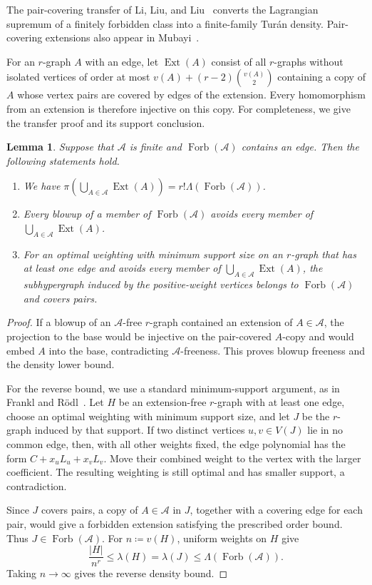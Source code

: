 \documentclass[10pt]{article}
\numberwithin{equation}{section}
\newtheorem{lemma}[lemma]{Lemma}\aliascntresetthe{lemma}
\theoremstyle{definition}
\newcommand{\cA}{\mathcal A}\newcommand{\cB}{\mathcal B}\newcommand{\cC}{\mathcal C}
\newcommand{\Forb}{\operatorname{Forb}}\newcommand{\Ext}{\operatorname{Ext}}
\begin{document}
The pair-covering transfer of Li, Liu, and Liu~\cite{LiLiuLiu2026} converts the Lagrangian supremum of a finitely forbidden class into a finite-family Tur\'an density. Pair-covering extensions also appear in Mubayi~\cite{Mubayi2006}.

For an $r$-graph $A$ with an edge, let $\Ext(A)$ consist of all $r$-graphs without isolated vertices of order at most $v(A)+(r-2)\binom{v(A)}2$ containing a copy of $A$ whose vertex pairs are covered by edges of the extension. Every homomorphism from an extension is therefore injective on this copy. For completeness, we give the transfer proof and its support conclusion.
\begin{lemma}\label{lem:pairtransfer}
Suppose that $\cA$ is finite and $\Forb(\cA)$ contains an edge. Then the following statements hold.
\begin{enumerate}
\item We have $\pi(\bigcup_{A\in\cA}\Ext(A))=r!\Lambda(\Forb(\cA))$.
\item Every blowup of a member of $\Forb(\cA)$ avoids every member of $\bigcup_{A\in\cA}\Ext(A)$.
\item For an optimal weighting with minimum support size on an $r$-graph that has at least one edge and avoids every member of $\bigcup_{A\in\cA}\Ext(A)$, the subhypergraph induced by the positive-weight vertices belongs to $\Forb(\cA)$ and covers pairs.
\end{enumerate}
\end{lemma}
\begin{proof}
If a blowup of an $\cA$-free $r$-graph contained an extension of $A\in\cA$, the projection to the base would be injective on the pair-covered $A$-copy and would embed $A$ into the base, contradicting $\cA$-freeness. This proves blowup freeness and the density lower bound.

For the reverse bound, we use a standard minimum-support argument, as in Frankl and R\"odl~\cite{FranklRodl1984}. Let $H$ be an extension-free $r$-graph with at least one edge, choose an optimal weighting with minimum support size, and let $J$ be the $r$-graph induced by that support. If two distinct vertices $u,v\in V(J)$ lie in no common edge, then, with all other weights fixed, the edge polynomial has the form $C+x_uL_u+x_vL_v$. Move their combined weight to the vertex with the larger coefficient. The resulting weighting is still optimal and has smaller support, a contradiction.

Since $J$ covers pairs, a copy of $A\in\cA$ in $J$, together with a covering edge for each pair, would give a forbidden extension satisfying the prescribed order bound. Thus $J\in\Forb(\cA)$. For $n\coloneqq v(H)$, uniform weights on $H$ give
\[
 \frac{|H|}{n^r}\le\lambda(H)=\lambda(J)\le\Lambda(\Forb(\cA)).
\]
Taking $n\to\infty$ gives the reverse density bound.
\end{proof}
\end{document}
